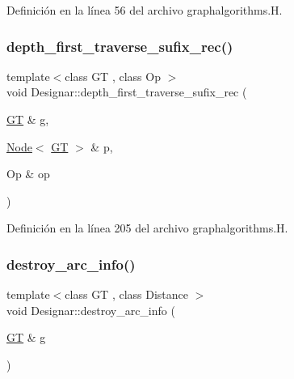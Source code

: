 Definición en la línea 56 del archivo graphalgorithms.\+H.

\mbox{\label{namespace_designar_ab028f52b5df8eed5dadeda85d45fa0f2}} 
\subsubsection{\texorpdfstring{depth\+\_\+first\+\_\+traverse\+\_\+sufix\+\_\+rec()}{depth\_first\_traverse\_sufix\_rec()}}
{\footnotesize\ttfamily template$<$class GT , class Op $>$ \\
void Designar\+::depth\+\_\+first\+\_\+traverse\+\_\+sufix\+\_\+rec (\begin{DoxyParamCaption}\item[{\hyperlink{demo-buildgraph_8_c_a3001c40d2c31ca87ed96cd7d1334a55e}{GT} \&}]{g,  }\item[{\hyperlink{namespace_designar_a5af326c65aa2bd26b26c410f2030d09e}{Node}$<$ \hyperlink{demo-buildgraph_8_c_a3001c40d2c31ca87ed96cd7d1334a55e}{GT} $>$ \&}]{p,  }\item[{Op \&}]{op }\end{DoxyParamCaption})}



Definición en la línea 205 del archivo graphalgorithms.\+H.

\mbox{\label{namespace_designar_ae7f5b6163106f0008d39cbed1cb8eaa2}} 
\subsubsection{\texorpdfstring{destroy\+\_\+arc\+\_\+info()}{destroy\_arc\_info()}}
{\footnotesize\ttfamily template$<$class GT , class Distance $>$ \\
void Designar\+::destroy\+\_\+arc\+\_\+info (\begin{DoxyParamCaption}\item[{\hyperlink{demo-buildgraph_8_c_a3001c40d2c31ca87ed96cd7d1334a55e}{GT} \&}]{g }\end{DoxyParamCaption})}



